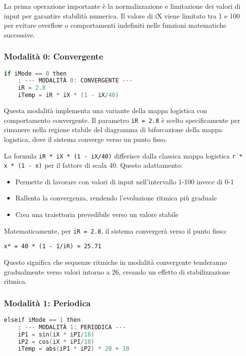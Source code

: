 La prima operazione importante è la normalizzazione e limitazione dei valori di input per garantire stabilità numerica. Il valore di iX viene limitato tra 1 e 100 per evitare overflow o comportamenti indefiniti nelle funzioni matematiche successive.
\subsubsection{Modalità 0: Convergente}
\begin{lstlisting}[language=C]
if iMode == 0 then
    ; --- MODALITÀ 0: CONVERGENTE ---
    iR = 2.8
    iTemp = iR * iX * (1 - iX/40)
\end{lstlisting}

Questa modalità implementa una variante della mappa logistica con comportamento convergente. Il parametro \texttt{iR = 2.8} è scelto specificamente per rimanere nella regione stabile del diagramma di biforcazione della mappa logistica, dove il sistema converge verso un punto fisso.

La formula \texttt{iR * iX * (1 {-} iX/40)} differisce dalla classica mappa logistica \texttt{r * x * (1 {-} x)} per il fattore di scala 40. Questo adattamento:
\begin{itemize}
    \item Permette di lavorare con valori di input nell'intervallo 1-100 invece di 0-1
    \item Rallenta la convergenza, rendendo l'evoluzione ritmica più graduale
    \item Crea una traiettoria prevedibile verso un valore stabile
\end{itemize}

Matematicamente, per \texttt{iR = 2.8}, il sistema convergerà verso il punto fisso:
\begin{lstlisting}
x* = 40 * (1 - 1/iR) ≈ 25.71
\end{lstlisting}

Questo significa che sequenze ritmiche in modalità convergente tenderanno gradualmente verso valori intorno a 26, creando un effetto di stabilizzazione ritmica.
\subsubsection{Modalità 1: Periodica}
\begin{lstlisting}[language=C]
elseif iMode == 1 then
    ; --- MODALITÀ 1: PERIODICA ---
    iP1 = sin(iX * iPI/18)
    iP2 = cos(iX * iPI/10)
    iTemp = abs(iP1 * iP2) * 20 + 10
\end{lstlisting}

